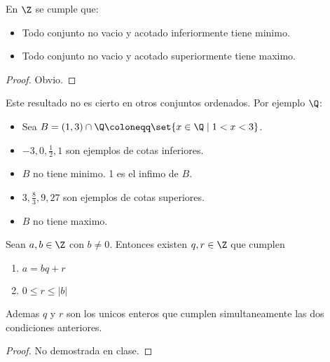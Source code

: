 \begin{proposition}
	En \(\Z \) se cumple que:
	\begin{itemize}
		\item Todo conjunto no vacio y acotado inferiormente tiene minimo.
		\item Todo conjunto no vacio y acotado superiormente tiene maximo.
	\end{itemize}
\end{proposition}
\begin{proof}
	Obvio.
\end{proof}

\begin{example}
	Este resultado no es cierto en otros conjuntos ordenados. Por ejemplo \(\Q \):
	\begin{itemize}
		\item Sea \(B = (1,3) \cap \Q \coloneqq \set{x \in \Q \mid 1 < x < 3 }\).
		\item \(-3, 0, \frac{1}{2}, 1 \) son ejemplos de cotas inferiores.
		\item \(B \) no tiene minimo. 1 es el infimo de \(B \).
		\item \(3,\frac{8}{3},9,27 \) son ejemplos de cotas superiores.
		\item \(B \) no tiene maximo.
	\end{itemize}
\end{example}

\begin{theorem}
	Sean \(a,b \in \Z \) con \(b \neq 0 \). Entonces existen \(q,r \in \Z \) que cumplen
	\begin{enumerate}
		\item \(a = bq + r \)
		\item \(0 \leq r \leq |b| \)
	\end{enumerate}
	Ademas \(q \) y \(r \) son los unicos enteros que cumplen simultaneamente las dos condiciones anteriores.
\end{theorem}
\begin{proof}
	No demostrada en clase.
\end{proof}

